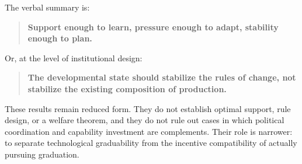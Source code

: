 The verbal summary is:
\begin{quote}
\textbf{Support enough to learn, pressure enough to adapt, stability enough to plan.}
\end{quote}
Or, at the level of institutional design:
\begin{quote}
\textbf{The developmental state should stabilize the rules of change, not stabilize the existing composition of production.}
\end{quote}

These results remain reduced form. They do not establish optimal support, rule design, or a welfare theorem, and they do not rule out cases in which political coordination and capability investment are complements. Their role is narrower: to separate technological graduability from the incentive compatibility of actually pursuing graduation.

